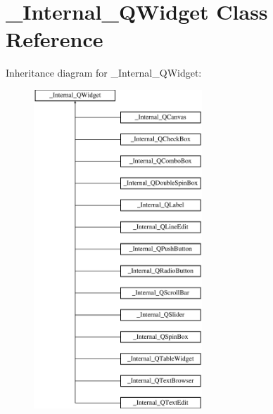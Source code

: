 \hypertarget{class__Internal__QWidget}{}\section{\+\_\+\+Internal\+\_\+\+Q\+Widget Class Reference}
\label{class__Internal__QWidget}
Inheritance diagram for \+\_\+\+Internal\+\_\+\+Q\+Widget\+:\begin{figure}[H]
\begin{center}
\leavevmode
\includegraphics[height=12.000000cm]{class__Internal__QWidget}
\end{center}
\end{figure}

